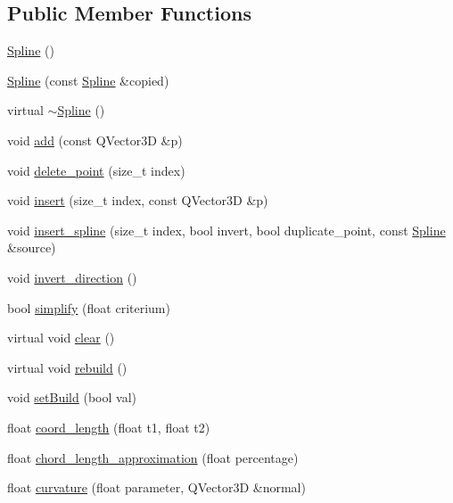 \subsection*{Public Member Functions}
\begin{DoxyCompactItemize}
\item 
\hyperlink{classShipCAD_1_1Spline_a7ad84ea604562c7c9cb309b4e78e25c5}{Spline} ()
\item 
\hyperlink{classShipCAD_1_1Spline_a891b0c893b8124dca341680076854bff}{Spline} (const \hyperlink{classShipCAD_1_1Spline}{Spline} \&copied)
\item 
virtual \hyperlink{classShipCAD_1_1Spline_a0c900ca3c99987532e1d0c21ba992968}{$\sim$\-Spline} ()
\item 
void \hyperlink{classShipCAD_1_1Spline_ac3d9f4514573be91b316413bf062791a}{add} (const Q\-Vector3\-D \&p)
\item 
void \hyperlink{classShipCAD_1_1Spline_a120c5530571f138daad61426053220f3}{delete\-\_\-point} (size\-\_\-t index)
\item 
void \hyperlink{classShipCAD_1_1Spline_aa1ea6446e0b59d5cce88580242cd25b6}{insert} (size\-\_\-t index, const Q\-Vector3\-D \&p)
\item 
void \hyperlink{classShipCAD_1_1Spline_aa8e588b92d23c74bb6ec120624b49e54}{insert\-\_\-spline} (size\-\_\-t index, bool invert, bool duplicate\-\_\-point, const \hyperlink{classShipCAD_1_1Spline}{Spline} \&source)
\item 
void \hyperlink{classShipCAD_1_1Spline_a26293a4ee636c2b968c45731425d5c94}{invert\-\_\-direction} ()
\item 
bool \hyperlink{classShipCAD_1_1Spline_a043f418b363a0dc7161b9106a72ef8b4}{simplify} (float criterium)
\item 
virtual void \hyperlink{classShipCAD_1_1Spline_a02967f3eee8b1755eab0d7da55c3c621}{clear} ()
\item 
virtual void \hyperlink{classShipCAD_1_1Spline_a9b466ad7510032dafb0421f2d834bde6}{rebuild} ()
\item 
void \hyperlink{classShipCAD_1_1Spline_a6e932411f0f4463514f80011c58f5e6a}{set\-Build} (bool val)
\item 
float \hyperlink{classShipCAD_1_1Spline_a9d4d64a34b1511efc5c41b9e31956a3e}{coord\-\_\-length} (float t1, float t2)
\item 
float \hyperlink{classShipCAD_1_1Spline_ae15513771d88f4f545048d4204e98325}{chord\-\_\-length\-\_\-approximation} (float percentage)
\item 
float \hyperlink{classShipCAD_1_1Spline_a5681a27480f934a73462e53b2b4e2461}{curvature} (float parameter, Q\-Vector3\-D \&normal)

\end{DoxyCompactItemize}
